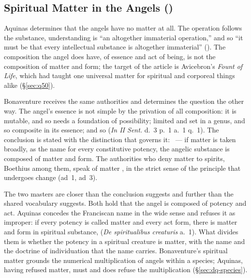 \subsection{Spiritual Matter in the Angels ()}\label{sec:dq-matter}

Aquinas determines that the angels have no matter at all. The operation
follows the substance, understanding is ``an altogether immaterial
operation,'' and so ``it must be that every intellectual substance is
altogether immaterial'' (). The composition the angel
does have, of essence and act of being, is not the composition of matter
and form; the target of the article is Avicebron's \emph{Fount of Life},
which had taught one universal matter for spiritual and corporeal things
alike (\S\ref{sec:q50}).

Bonaventure receives the same authorities and determines the question the
other way. The angel's essence is not simple by the privation of all
composition: it is mutable, and so needs a foundation of possibility;
limited and set in a genus, and so composite in its essence; and so
 (\emph{In II Sent.} d.~3 p.~1 a.~1 q.~1).
The conclusion is stated with the distinction that governs it:
~--- if matter is taken broadly, as the name for every constitutive
potency, the angelic substance is composed of matter and form. The
authorities who deny matter to spirits, Boethius among them, speak of
matter , in the strict sense of the principle that
undergoes change (ad~1, ad~3).

The two masters are closer than the conclusion suggests and further than
the shared vocabulary suggests. Both hold that the angel is composed of
potency and act. Aquinas concedes the Franciscan name in the wide sense
and refuses it as improper: if every potency is called matter and every
act form, there is matter and form in spiritual substance, 
(\emph{De spiritualibus creaturis} a.~1). What divides them is whether
the potency in a spiritual creature is matter, with the name and the
doctrine of individuation that the name carries. Bonaventure's spiritual
matter grounds the numerical multiplication of angels within a species;
Aquinas, having refused matter, must and does refuse the multiplication
(\S\ref{sec:dq-species}).

